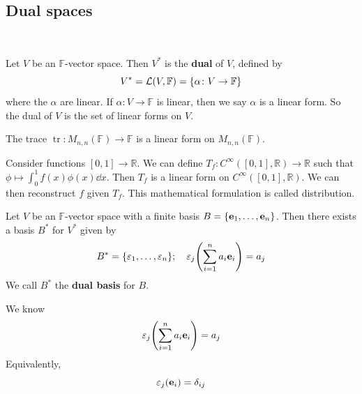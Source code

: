 \documentclass[a4paper,11pt]{article}
\begin{document}
\subsection{Dual spaces}\ \vspace*{-1.5em}
\begin{definition}
	Let $ V $ be an $ \mathbb{F} $-vector space.
	Then $ V^* $ is the \textbf{dual} of $ V $, defined by
	\[
		V^* = {\mathcal{L}}(V,\mathbb F) = \qty{\alpha \colon V \to \mathbb F}
	\]
	where the $ \alpha $ are linear.
	If $ \alpha \colon V \to \mathbb F $ is linear, then we say $ \alpha $ is a linear form.
	So the dual of $ V $ is the set of linear forms on $ V $.
\end{definition}
\begin{example}
	The trace $ \operatorname{tr} \colon M_{n,n}(\mathbb F) \to \mathbb F $ is a linear form on $ M_{n,n}(\mathbb F) $.
\end{example}
\begin{example}
	Consider functions $ [0,1] \to \mathbb R $.
	We can define $ T_f \colon C^\infty([0,1], \mathbb R) \to \mathbb R $ such that $ \phi \mapsto \int_0^1 f(x) \phi(x) \dd{x} $.
	Then $ T_f $ is a linear form on $ C^{\infty}([0,1], \mathbb R) $.
	We can then reconstruct $ f $ given $ T_f $.
	This mathematical formulation is called distribution.
\end{example}
\begin{lemma}
	Let $ V $ be an $ \mathbb F $-vector space with a finite basis $ B = \qty{{\bf e}_1, \dots, {\bf e}_n} $.
	Then there exists a basis $ B^* $ for $ V^* $ given by
	\[
		B^* = \qty{\varepsilon_1, \dots, \varepsilon_n}; \quad \varepsilon_j \qty( \sum_{i=1}^n a_i {\bf e}_i ) = a_j
	\]
	We call $ B^* $ the \textbf{dual basis} for $ B $.
\end{lemma}
We know
\[
    \varepsilon_j \qty( \sum_{i=1}^n a_i {\bf e}_i ) = a_j
\]
Equivalently,
\[
    \varepsilon_j ({\bf e}_i) = \delta_{ij}
\]
\end{document}
